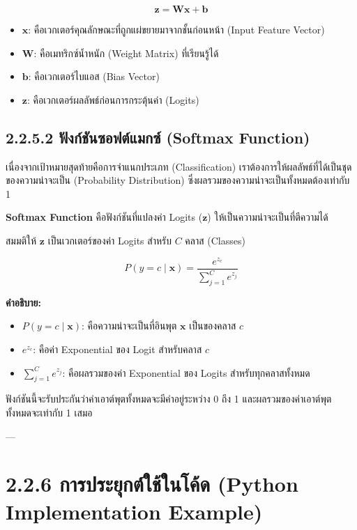 \documentclass[11pt,a4paper,openany]{report}
\begin{document}
$$\mathbf{z} = \mathbf{W} \mathbf{x} + \mathbf{b}$$


\begin{itemize}
  \item $\mathbf{x}$: คือเวกเตอร์คุณลักษณะที่ถูกแผ่ขยายมาจากชั้นก่อนหน้า (Input Feature Vector)
  \item $\mathbf{W}$: คือเมทริกซ์น้ำหนัก (Weight Matrix) ที่เรียนรู้ได้
  \item $\mathbf{b}$: คือเวกเตอร์ไบแอส (Bias Vector)
  \item $\mathbf{z}$: คือเวกเตอร์ผลลัพธ์ก่อนการกระตุ้นค่า (Logits)
\end{itemize}


\subsection{2.2.5.2 ฟังก์ชันซอฟต์แมกซ์ (Softmax Function)}


เนื่องจากเป้าหมายสุดท้ายคือการจำแนกประเภท (Classification) เราต้องการให้ผลลัพธ์ที่ได้เป็นชุดของความน่าจะเป็น (Probability Distribution) ซึ่งผลรวมของความน่าจะเป็นทั้งหมดต้องเท่ากับ 1

\textbf{Softmax Function} คือฟังก์ชันที่แปลงค่า Logits ($\mathbf{z}$) ให้เป็นความน่าจะเป็นที่ตีความได้

สมมติให้ $\mathbf{z}$ เป็นเวกเตอร์ของค่า Logits สำหรับ $C$ คลาส (Classes)

$$P(y = c \mid \mathbf{x}) = \frac{e^{z_c}}{\sum_{j=1}^{C} e^{z_j}}$$


\textbf{คำอธิบาย:}

\begin{itemize}
  \item $P(y = c \mid \mathbf{x})$: คือความน่าจะเป็นที่อินพุต $\mathbf{x}$ เป็นของคลาส $c$
  \item $e^{z_c}$: คือค่า Exponential ของ Logit สำหรับคลาส $c$
  \item $\sum_{j=1}^{C} e^{z_j}$: คือผลรวมของค่า Exponential ของ Logits สำหรับทุกคลาสทั้งหมด
\end{itemize}


ฟังก์ชันนี้จะรับประกันว่าค่าเอาต์พุตทั้งหมดจะมีค่าอยู่ระหว่าง 0 ถึง 1 และผลรวมของค่าเอาต์พุตทั้งหมดจะเท่ากับ 1 เสมอ

---

\section{2.2.6 การประยุกต์ใช้ในโค้ด (Python Implementation Example)}
\end{document}
